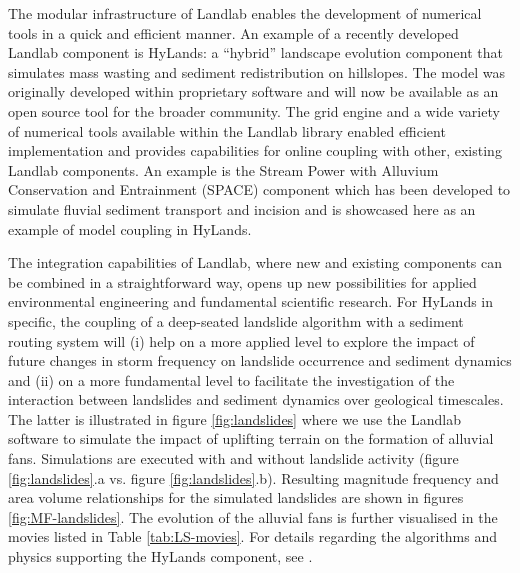 \documentclass[12pt]{amsart}
\begin{document}
The modular infrastructure of Landlab enables the development of numerical tools in a quick and efficient manner. An example of a recently developed Landlab component is HyLands: a ``hybrid'' landscape evolution component that simulates mass wasting and sediment redistribution on hillslopes. The model was originally developed within proprietary software \citep{Campforts2020} and will now be available as an open source tool for the broader community. The grid engine and a wide variety of numerical tools available within the Landlab library enabled efficient implementation and provides capabilities for online coupling with other, existing Landlab components. An example is the Stream Power with Alluvium Conservation and Entrainment (SPACE) component which has been developed to simulate fluvial sediment transport and incision \citep{shobe2017space} and is showcased here as an example of model coupling in HyLands. 

The integration capabilities of Landlab, where new and existing components can be combined in a straightforward way, opens up new possibilities for applied environmental engineering and fundamental scientific research. For HyLands in specific, the coupling of a deep-seated landslide algorithm with a sediment routing system will (i) help on a more applied level to explore the impact of future changes in storm frequency on landslide occurrence and sediment dynamics  \cite{Fan2019} and (ii) on a more fundamental level to facilitate the investigation of the interaction between landslides and sediment dynamics over geological timescales. The latter is illustrated in figure \ref{fig:landslides} where we use the Landlab software to simulate the impact of uplifting terrain on the formation of alluvial fans. Simulations are executed with and without landslide activity (figure \ref{fig:landslides}.a vs. figure \ref{fig:landslides}.b). Resulting magnitude frequency and area volume relationships for the simulated landslides are shown in figures \ref{fig:MF-landslides}. The evolution of the alluvial fans is further visualised in the movies listed in Table \ref{tab:LS-movies}. For details regarding the algorithms and physics supporting the HyLands component, see \citep{Campforts2020}. 
\end{document}
